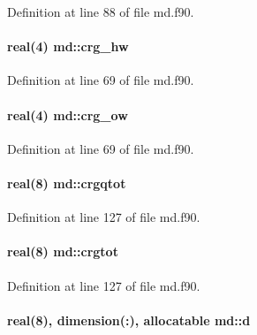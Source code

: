 Definition at line 88 of file md.\-f90.

\hypertarget{classmd_a6d712cef1e054fe1742a7df3438b4610}{
\paragraph[{crg\-\_\-hw}]{\setlength{\rightskip}{0pt plus 5cm}real(4) md\-::crg\-\_\-hw}}\label{classmd_a6d712cef1e054fe1742a7df3438b4610}


Definition at line 69 of file md.\-f90.

\hypertarget{classmd_ad5eaf701ffc88248bd1659cd9cbda43c}{
\paragraph[{crg\-\_\-ow}]{\setlength{\rightskip}{0pt plus 5cm}real(4) md\-::crg\-\_\-ow}}\label{classmd_ad5eaf701ffc88248bd1659cd9cbda43c}


Definition at line 69 of file md.\-f90.

\hypertarget{classmd_aee43ff7abaa6826662de08f51f40bef4}{
\paragraph[{crgqtot}]{\setlength{\rightskip}{0pt plus 5cm}real(8) md\-::crgqtot}}\label{classmd_aee43ff7abaa6826662de08f51f40bef4}


Definition at line 127 of file md.\-f90.

\hypertarget{classmd_a275c00abe17b57f21ec87c8931bba4ed}{
\paragraph[{crgtot}]{\setlength{\rightskip}{0pt plus 5cm}real(8) md\-::crgtot}}\label{classmd_a275c00abe17b57f21ec87c8931bba4ed}


Definition at line 127 of file md.\-f90.

\hypertarget{classmd_a8fe955cf1afc3e558079e3f123d5cc4e}{
\paragraph[{d}]{\setlength{\rightskip}{0pt plus 5cm}real(8), dimension(\-:), allocatable md\-::d}}\label{classmd_a8fe955cf1afc3e558079e3f123d5cc4e}


